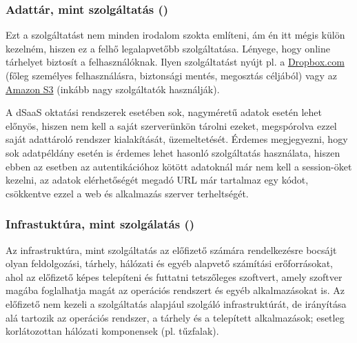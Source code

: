 \subsubsection{Adattár, mint szolgáltatás ()}
Ezt a szolgáltatást nem minden irodalom szokta említeni, ám én itt mégis külön kezelném, hiszen ez a felhő legalapvetőbb szolgáltatása. Lényege, hogy online tárhelyet biztosít a felhasználóknak. Ilyen szolgáltatást nyújt pl. a \href{http://www.dropbox.com}{Dropbox.com} (főleg személyes felhasználásra, biztonsági mentés, megosztás céljából) vagy az \href{https://aws.amazon.com/s3/}{Amazon S3} (inkább nagy szolgáltatók használják).

A dSaaS oktatási rendszerek esetében sok, nagyméretű adatok esetén lehet előnyös, hiszen nem kell a saját szerverünkön tárolni ezeket, megspórolva ezzel saját adattároló rendszer kialakítását, üzemeltetését. Érdemes megjegyezni, hogy sok adatpéldány esetén is érdemes lehet hasonló szolgáltatás használata, hiszen ebben az esetben az autentikációhoz kötött adatoknál már nem kell a session-öket kezelni, az adatok elérhetőségét megadó URL már tartalmaz egy kódot, csökkentve ezzel a web és alkalmazás szerver terheltségét. 


\subsubsection{Infrastuktúra, mint szolgálatás ()}

Az infrastruktúra, mint szolgáltatás az előfizető számára rendelkezésre bocsájt olyan feldolgozási, tárhely, hálózati és egyéb alapvető számítási erőforrásokat, ahol az előfizető képes telepíteni és futtatni tetszőleges szoftvert, amely szoftver magába foglalhatja magát az operációs rendszert és egyéb alkalmazásokat is. Az előfizető nem kezeli a szolgáltatás alapjául szolgáló infrastruktúrát, de irányítása alá tartozik az operációs rendszer, a tárhely és a telepített alkalmazások; esetleg korlátozottan hálózati komponensek (pl. tűzfalak).\cite{nistsp800-145}

